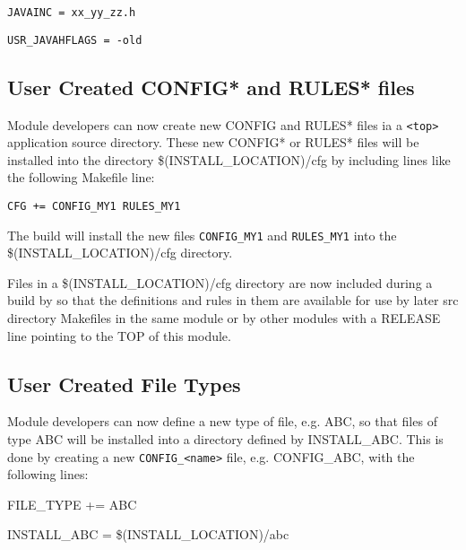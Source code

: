 \begin{description}
\item \verb|JAVAINC = xx_yy_zz.h|

\item \verb|USR_JAVAHFLAGS = -old|

\end{description}

\subsection{User Created CONFIG* and RULES* files}

Module developers can now create new CONFIG and RULES* files ia a \verb|<top>| application source directory. These new 
CONFIG* or RULES* files will be installed into the directory \$(INSTALL\_LOCATION)/cfg by including lines like the 
following Makefile line:

\begin{description}
\item {}\verb|CFG += CONFIG_MY1 RULES_MY1|

\end{description}

The build will install the new files \verb|CONFIG_MY1| and \verb|RULES_MY1| into the \$(INSTALL\_LOCATION)/cfg directory.

Files in a \$(INSTALL\_LOCATION)/cfg directory are now included during a build by so that the definitions and rules in 
them are available for use by later src directory Makefiles in the same module or by other modules with a RELEASE line 
pointing to the TOP of this module.

\subsection{User Created File Types}

Module developers can now define a new type of file, e.g. ABC, so that files of type ABC will be installed into a directory 
defined by INSTALL\_ABC. This is done by creating a new \verb|CONFIG_<name>| file, e.g. CONFIG\_ABC, with the 
following lines:

\begin{description}
\item {}FILE\_TYPE += ABC

\item INSTALL\_ABC = \$(INSTALL\_LOCATION)/abc

\end{description}

